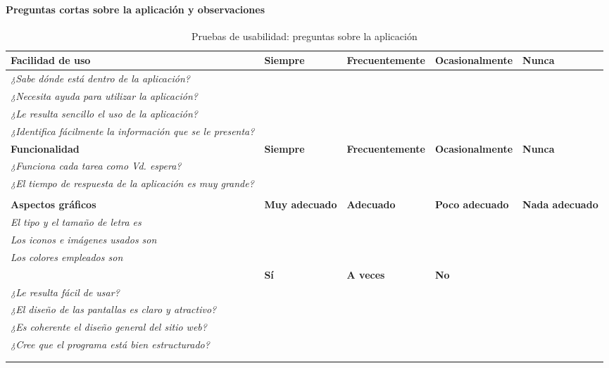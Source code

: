 \paragraph*{Preguntas cortas sobre la aplicación y observaciones}
\begin{table}[H]
\centering
\caption{Pruebas de usabilidad: preguntas sobre la aplicación}
\begin{tabular}{p{15em}|p{4em}|p{7.5em}|p{7.5em}|p{3em}}
\toprule
\rowcolor[rgb]{.949,  .949,  .949} \textbf{Facilidad de uso} & \textbf{Siempre} & \textbf{Frecuentemente} & \textbf{Ocasionalmente} & \textbf{Nunca} \\ \midrule
\textit{¿Sabe dónde está dentro de la aplicación?} & & & & \\ \midrule
\textit{¿Necesita ayuda para utilizar la aplicación?} & & & & \\ \midrule
\textit{¿Le resulta sencillo el uso de la aplicación?} & & & & \\ \midrule
\textit{¿Identifica fácilmente la información que se le presenta?} & & & & \\ \midrule
\rowcolor[rgb]{.949,  .949,  .949} \textbf{Funcionalidad} & \textbf{Siempre} & \textbf{Frecuentemente} & \textbf{Ocasionalmente} & \textbf{Nunca} \\ \midrule
\textit{¿Funciona cada tarea como Vd. espera?} & & & & \\ \midrule
\textit{¿El tiempo de respuesta de la aplicación es muy grande?} & & & & \\ \midrule
\rowcolor[rgb]{ .851,  .886,  .953} \multicolumn{5}{p{36em}}{\textbf{Calidad del interfaz}} \\ \midrule
\rowcolor[rgb]{.949,  .949,  .949} \textbf{Aspectos gráficos} & \textbf{Muy adecuado} & \textbf{Adecuado} & \textbf{Poco adecuado} & \textbf{Nada adecuado} \\ \midrule
\textit{El tipo y el tamaño de letra es} & & & & \\ \midrule
\textit{Los iconos e imágenes usados son} & & & & \\ \midrule
\textit{Los colores empleados son} & & & & \\ \midrule
\rowcolor[rgb]{.949,  .949,  .949}\multicolumn{2}{p{19em}|}{\textbf{Diseño de la interfaz}} & \textbf{Sí} & \textbf{A veces} & \textbf{No} \\ \midrule
\multicolumn{2}{p{19em}|}{\textit{¿Le resulta fácil de usar?}} & & & \\ \midrule
\multicolumn{2}{p{19em}|}{\textit{¿El diseño de las pantallas es claro y atractivo?}} & & & \\ \midrule
\multicolumn{2}{p{19em}|}{\textit{¿Es coherente el diseño general del sitio web?}} & & & \\ \midrule
\multicolumn{2}{p{19em}|}{\textit{¿Cree que el programa está bien estructurado?}} & & & \\ \midrule
\rowcolor[rgb]{ .851,  .886,  .953}\multicolumn{5}{p{36em}}{\textbf{Observaciones}} \\ \midrule
\multicolumn{5}{p{36em}}{} \\ \bottomrule
\end{tabular}
\end{table}

